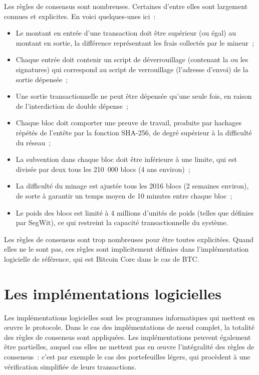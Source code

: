 Les règles de consensus sont nombreuses. Certaines d'entre elles sont largement connues et explicites. En voici quelques-unes ici~:

\begin{itemize}
\item Le montant en entrée d'une transaction doit être supérieur (ou égal) au montant en sortie, la différence représentant les frais collectés par le mineur~;
\item Chaque entrée doit contenir un script de déverrouillage (contenant la ou les signatures) qui correspond au script de verrouillage (l'adresse d'envoi) de la sortie dépensée~;
\item Une sortie transactionnelle ne peut être dépensée qu'une seule fois, en raison de l'interdiction de double dépense~;
\item Chaque bloc doit comporter une preuve de travail, produite par hachages répétés de l'entête par la fonction SHA-256, de degré supérieur à la difficulté du réseau~;
\item La subvention dans chaque bloc doit être inférieure à une limite, qui est divisée par deux tous les 210~000 blocs (4 ans environ)~;
\item La difficulté du minage est ajustée tous les 2016 blocs (2 semaines environ), de sorte à garantir un temps moyen de 10 minutes entre chaque bloc~;
\item Le poids des blocs est limité à 4 millions d'unités de poids (telles que définies par SegWit), ce qui restreint la capacité transactionnelle du système.
\end{itemize}

Les règles de consensus sont trop nombreuses pour être toutes explicitées. Quand elles ne le sont pas, ces règles sont implicitement définies dans l'implémentation logicielle de référence, qui est Bitcoin Core dans le cas de BTC.

\section*{Les implémentations logicielles}


Les implémentations logicielles sont les programmes informatiques qui mettent en œuvre le protocole. Dans le cas des implémentations de nœud complet, la totalité des règles de consensus sont appliquées. Les implémentations peuvent également être partielles, auquel cas elles ne mettent pas en œuvre l'intégralité des règles de consensus~: c'est par exemple le cas des portefeuilles légers, qui procèdent à une vérification simplifiée de leurs transactions.

